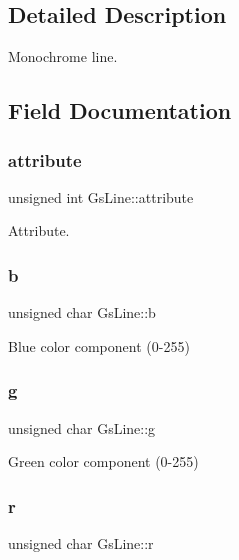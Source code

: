 \subsection{Detailed Description}
Monochrome line. 

\subsection{Field Documentation}
\mbox{\label{structGsLine_ae6c49c59ee6587c941678ecb2a11dbe7}} 
\subsubsection{\texorpdfstring{attribute}{attribute}}
{\footnotesize\ttfamily unsigned int Gs\+Line\+::attribute}



Attribute. 

\mbox{\label{structGsLine_a99701c888c36ce7e0f4cf9133949d305}} 
\subsubsection{\texorpdfstring{b}{b}}
{\footnotesize\ttfamily unsigned char Gs\+Line\+::b}



Blue color component (0-\/255) 

\mbox{\label{structGsLine_a266688a62e598c2240daf3f207a95057}} 
\subsubsection{\texorpdfstring{g}{g}}
{\footnotesize\ttfamily unsigned char Gs\+Line\+::g}



Green color component (0-\/255) 

\mbox{\label{structGsLine_a382e46657bca42b20566e51ce1650673}} 
\subsubsection{\texorpdfstring{r}{r}}
{\footnotesize\ttfamily unsigned char Gs\+Line\+::r}



